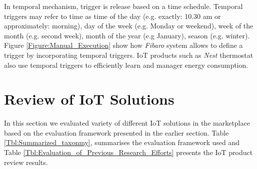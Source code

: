 \documentclass[journal]{IEEEtran}
\begin{document}
In temporal  mechanism, trigger is release based on a time schedule. Temporal triggers may refer to time as time of the day (e.g. exactly: 10.30 am or approximately: morning), day of the week (e.g. Monday or weekend), week of the month (e.g. second week), month of the year (e.g January), season (e.g. winter). Figure \ref{Figure:Manual_Execution} show how \textit{Fibaro} system allows to define a trigger by incorporating temporal triggers. IoT products such as \textit{Nest} thermostat also use temporal triggers to efficiently learn and manager energy consumption.


  
  \section{Review of IoT Solutions}
  \label{sec:Review}

In this section we evaluated variety of different IoT solutions in the marketplace based on the evaluation framework presented in the earlier section. Table \ref{Tbl:Summarized_taxonmy}, summarises the evaluation framework used and Table \ref{Tbl:Evaluation_of_Previous_Research_Efforts} presents the IoT product review results.
\end{document}
